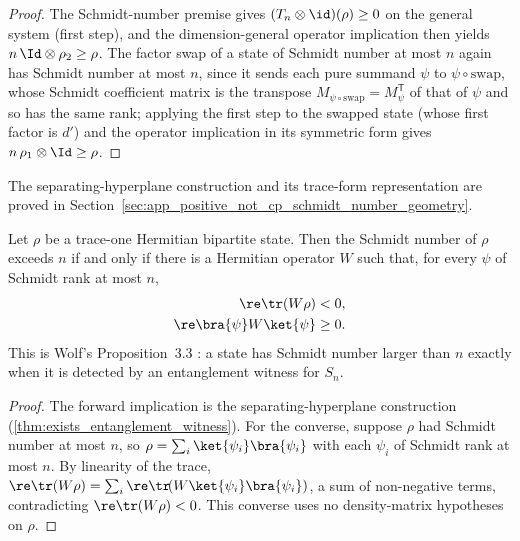 \begin{proof}
    \leanok
    The Schmidt-number premise gives $(T_n\otimes\id)(\rho)\ge 0$ on the general system
    (first step), and the dimension-general operator implication then yields
    $n\,\Id\otimes\rho_2\ge\rho$. The factor swap of a state of Schmidt number at most
    $n$ again has Schmidt number at most $n$, since it sends each pure summand $\psi$ to
    $\psi\circ\mathrm{swap}$, whose Schmidt coefficient matrix is the transpose
    $M_{\psi\circ\mathrm{swap}}=M_\psi^{\mathsf T}$ of that of $\psi$ and so has the same
    rank; applying the first step to the swapped state (whose first factor is $d'$) and
    the operator implication in its symmetric form gives $n\,\rho_1\otimes\Id\ge\rho$.
\end{proof}


The separating-hyperplane construction and its trace-form representation are
proved in Section~\ref{sec:app_positive_not_cp_schmidt_number_geometry}.

\begin{theorem}
    \label{thm:not_has_schmidt_number_le_iff_exists_witness}
    \leanok
    Let $\rho$ be a trace-one Hermitian bipartite state. Then the Schmidt number of
    $\rho$ exceeds $n$ if and only if there is a Hermitian operator $W$ such that, for
    every $\psi$ of Schmidt rank at most $n$,
    \begin{align}
        \re\tr(W\rho)            & <0,
        \notag                            \\
        \re\bra{\psi}W\ket{\psi} & \ge 0.
        \notag
    \end{align}
    This is Wolf's Proposition~3.3 \cite[Chapter~3, Proposition~3.3]{Wolf2012Quantum}: a
    state has Schmidt number larger than $n$ exactly when it is detected by an
    entanglement witness for $S_n$.
\end{theorem}

\begin{proof}
    \leanok
    The forward implication is the separating-hyperplane construction
    (\ref{thm:exists_entanglement_witness}). For the converse, suppose $\rho$ had Schmidt
    number at most $n$, so $\rho=\sum_i\ket{\psi_i}\bra{\psi_i}$ with each $\psi_i$ of
    Schmidt rank at most $n$. By linearity of the trace,
    $\re\tr(W\rho)=\sum_i\re\tr\!(W\ket{\psi_i}\bra{\psi_i})$,
    a sum of non-negative terms, contradicting $\re\tr(W\rho)<0$. This
    converse uses no density-matrix hypotheses on $\rho$.
\end{proof}


